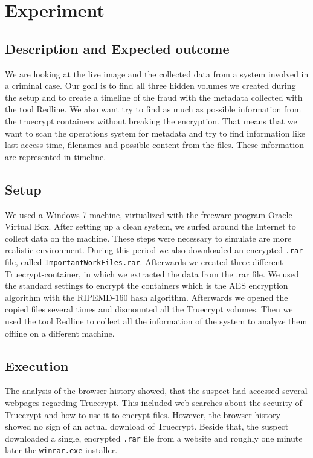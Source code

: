 \section{Experiment}
\subsection{Description and Expected outcome}
We are looking at the live image and the collected data from a system involved in a criminal case. Our goal is to find all three hidden volumes we created during the setup and to create a timeline of the fraud with the metadata collected with the tool Redline. 
We also want try to find as much as possible information from the truecrypt containers without breaking the encryption. That means that we want to scan the operations system for metadata and try to find information like last access time, filenames and possible content from the files. These information are represented in timeline.

\subsection{Setup}
We used a Windows 7 machine, virtualized with the freeware program Oracle Virtual Box. After setting up a clean system, we surfed around the Internet to collect data on the machine. 
These steps were necessary to simulate are more realistic environment.
During this period we also downloaded an encrypted \verb+.rar+ file, called \verb+ImportantWorkFiles.rar+. Afterwards we created three different Truecrypt-container, in which we extracted the data from the .rar file.
We used the standard settings to encrypt the containers which is the AES encryption algorithm with the RIPEMD-160 hash algorithm.
Afterwards we opened the copied files several times and dismounted all the Truecrypt volumes.
Then we used the tool Redline to collect all the information of the system to analyze them offline on a different machine.

\subsection{Execution}
The analysis of the browser history showed, that the suspect had accessed several webpages regarding Truecrypt. This included web-searches about the security of Truecrypt and how to use it to encrypt files. However, the browser history showed no sign of an actual download of Truecrypt. Beside that, the suspect downloaded a single, encrypted  \verb+.rar+ file from a website and roughly one minute later the \verb+winrar.exe+ installer.

